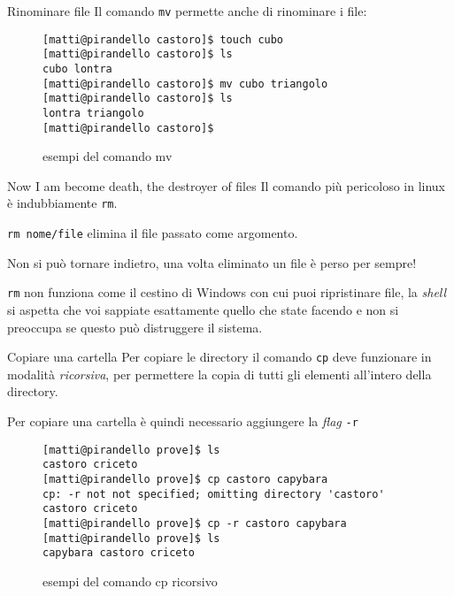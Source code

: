 \begin{frame}[fragile]{Rinominare file}
  Il comando \texttt{mv} permette anche di rinominare i file:
  \begin{figure}
    \begin{lstlisting}[basicstyle=\normalsize]
[matti@pirandello castoro]$ touch cubo
[matti@pirandello castoro]$ ls
cubo lontra
[matti@pirandello castoro]$ mv cubo triangolo
[matti@pirandello castoro]$ ls
lontra triangolo
[matti@pirandello castoro]$
    \end{lstlisting}
    \caption{esempi del comando mv}
  \end{figure}
\end{frame}

\begin{frame}{Now I am become death, the destroyer of files}
  Il comando più pericoloso in linux è indubbiamente \texttt{rm}.\bigskip

  \texttt{rm nome/file} elimina il file passato come argomento.\bigskip

  Non si può tornare indietro, una volta eliminato un file è perso per 
  sempre!\bigskip

  \texttt{rm} non funziona come il cestino di Windows con cui puoi ripristinare file,
  la \textit{shell} si aspetta che voi sappiate esattamente quello che state 
  facendo e non si preoccupa se questo può distruggere il sistema.
\end{frame}

\begin{frame}[fragile]{Copiare una cartella}
  Per copiare le directory il comando \texttt{cp} deve funzionare in modalità 
  \textit{ricorsiva}, per permettere la copia di tutti gli elementi all'intero
  della directory.\bigskip

  Per copiare una cartella è quindi necessario aggiungere la \textit{flag} 
  \texttt{-r}
  \begin{figure}
    \begin{lstlisting}[basicstyle=\footnotesize]
[matti@pirandello prove]$ ls 
castoro criceto
[matti@pirandello prove]$ cp castoro capybara 
cp: -r not not specified; omitting directory 'castoro'
castoro criceto
[matti@pirandello prove]$ cp -r castoro capybara 
[matti@pirandello prove]$ ls 
capybara castoro criceto
    \end{lstlisting}
    \caption{esempi del comando cp ricorsivo}
  \end{figure}
\end{frame}


